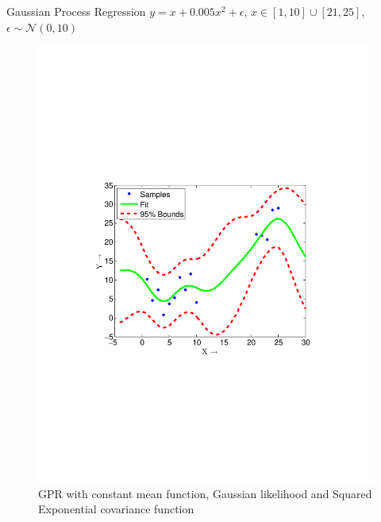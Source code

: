 \begin{frame}{Gaussian Process Regression}
$y = x+0.005x^2+ \epsilon$, $x \in [1,10] \cup [21,25]$,  $\epsilon \sim \mathcal{N}(0,10)$ 
\begin{figure}
\centering
\includegraphics[width=0.5\linewidth,trim=30mm 80mm 40mm 70mm,clip]{figures/gpml_fit}
\caption{ GPR with constant mean function, Gaussian likelihood and Squared Exponential covariance function}
\end{figure}
\end{frame}


